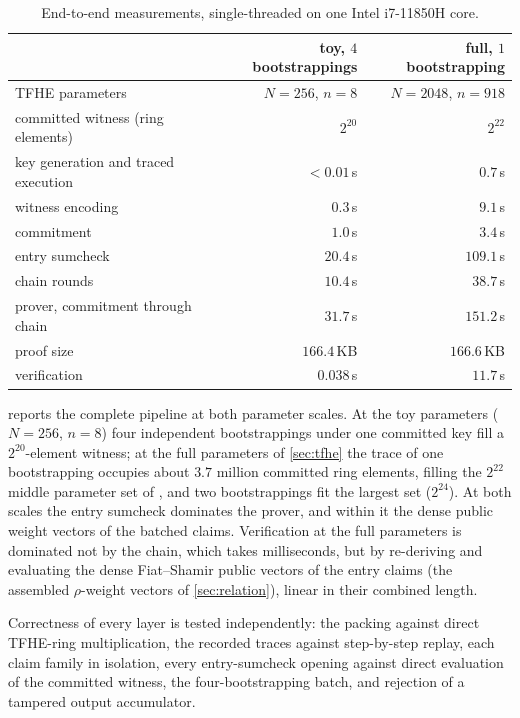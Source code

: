 \documentclass[11pt]{article}
\begin{document}
\begin{table}
\centering
\begin{tabular}{lrr}
\toprule
 & toy, $4$ bootstrappings & full, $1$ bootstrapping \\
\midrule
TFHE parameters & $N = 256$, $n = 8$ & $N = 2048$, $n = 918$ \\
committed witness (ring elements) & $2^{20}$ & $2^{22}$ \\
key generation and traced execution & $<0.01$\,s & $0.7$\,s \\
witness encoding & $0.3$\,s & $9.1$\,s \\
commitment & $1.0$\,s & $3.4$\,s \\
entry sumcheck & $20.4$\,s & $109.1$\,s \\
chain rounds & $10.4$\,s & $38.7$\,s \\
\midrule
prover, commitment through chain & $31.7$\,s & $151.2$\,s \\
proof size & $166.4$\,KB & $166.6$\,KB \\
verification & $0.038$\,s & $11.7$\,s \\
\bottomrule
\end{tabular}
\caption{End-to-end measurements, single-threaded on one Intel i7-11850H core.}
\label{tab:e2e}
\end{table}

 reports the complete pipeline at both parameter scales. At the toy parameters ($N = 256$, $n = 8$) four independent bootstrappings under one committed key fill a $2^{20}$-element witness; at the full parameters of \cref{sec:tfhe} the trace of one bootstrapping occupies about $3.7$ million committed ring elements, filling the $2^{22}$ middle parameter set of \cite{rokoko}, and two bootstrappings fit the largest set ($2^{24}$). At both scales the entry sumcheck dominates the prover, and within it the dense public weight vectors of the batched claims. Verification at the full parameters is dominated not by the chain, which takes milliseconds, but by re-deriving and evaluating the dense Fiat--Shamir public vectors of the entry claims (the assembled $\rho$-weight vectors of \cref{sec:relation}), linear in their combined length.

Correctness of every layer is tested independently: the packing against direct TFHE-ring multiplication, the recorded traces against step-by-step replay, each claim family in isolation, every entry-sumcheck opening against direct evaluation of the committed witness, the four-bootstrapping batch, and rejection of a tampered output accumulator.
\end{document}
